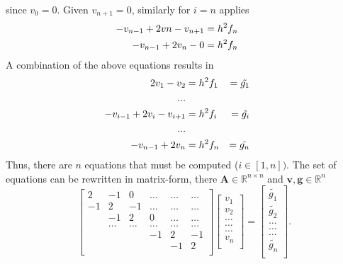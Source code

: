 \documentclass[%
oneside,                 %
final,                   %
10pt]{article}
\newcommand{\R}{\mathbb{R}}
\begin{document}
since $v_0=0$. Given $v_{n+1}=0$, similarly for $i=n$ applies
\begin{equation*}
\begin{aligned}
  -v_{n-1}+2vn - v_{n+1}&= h^2f_n  \hspace{0.5cm} \\
 -v_{n-1}+ 2v_n - 0&= h^2f_n  \hspace{0.5cm}
\end{aligned}
\end{equation*}
A combination of the above equations results in
\begin{equation*}
\begin{aligned}
  2v_1 - v_{2}&= h^2f_1 & = \tilde{g_1}  \hspace{0.5cm} \\
  ...\\
  -v_{i-1}+2v_i - v_{i+1}&= h^2f_i &= \tilde{g_i}  \hspace{0.5cm} \\
  ...\\
 -v_{n-1}+ 2v_n &= h^2f_n &= \tilde{g_n}  \hspace{0.5cm}
\end{aligned}
\end{equation*}
Thus, there are $n$ equations that must be computed ($i \in [1,n])$.
The set of equations can be rewritten in matrix-form, there $ \mathbf{A} \in \R^{n \times n} $ and $ \mathbf{v}, \mathbf{g} \in \R^{n}$
\[
     \begin{bmatrix}
                           2& -1 & 0 &\dots   & \dots &\dots \\
                           -1 & 2 & -1 &\dots &\dots &\dots \\
                           & -1 & 2 & 0 & \dots & \dots \\
                           & \dots   & \dots &\dots   &\dots & \dots \\
                           &   &  &-1  &2& -1 \\
                           &    &  &   &-1 & 2 \\
                      \end{bmatrix}\begin{bmatrix}
                           v_1\\
                           v_2\\
                           \dots \\
                          \dots  \\
                          \dots \\
                           v_n\\
                      \end{bmatrix}
  =\begin{bmatrix}
                          \tilde{ g_1}\\
                          \tilde{g_2}\\
                           \dots \\
                           \dots \\
                          \dots \\
                           \tilde{g_n}\\
                      \end{bmatrix}.
\]
\end{document}
